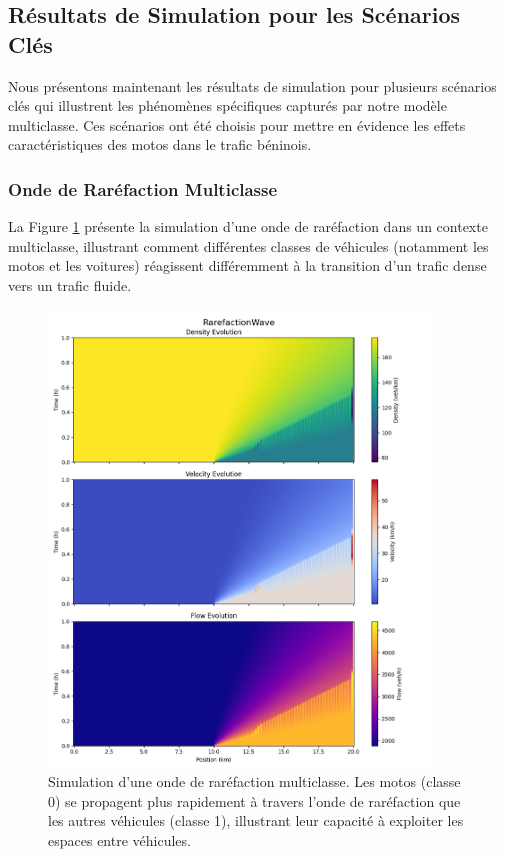 \subsection{Résultats de Simulation pour les Scénarios Clés}
\label{subsec:resultats_simulation}

Nous présentons maintenant les résultats de simulation pour plusieurs scénarios clés qui illustrent les phénomènes spécifiques capturés par notre modèle multiclasse. Ces scénarios ont été choisis pour mettre en évidence les effets caractéristiques des motos dans le trafic béninois.

\subsubsection{Onde de Raréfaction Multiclasse}
\label{subsubsec:rarefaction_multiclasse}

La Figure \ref{fig:rarefaction_multiclasse} présente la simulation d'une onde de raréfaction dans un contexte multiclasse, illustrant comment différentes classes de véhicules (notamment les motos et les voitures) réagissent différemment à la transition d'un trafic dense vers un trafic fluide.

\begin{figure}[htbp]
\centering
\includegraphics[width=0.9\textwidth]{simulations/MULTICLASS/rarefaction/rarefactionwave.png}
\caption{Simulation d'une onde de raréfaction multiclasse. Les motos (classe 0) se propagent plus rapidement à travers l'onde de raréfaction que les autres véhicules (classe 1), illustrant leur capacité à exploiter les espaces entre véhicules.}
\label{fig:rarefaction_multiclasse}
\end{figure}

